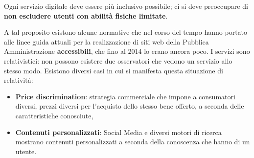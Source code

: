 \bigbreak
Ogni servizio digitale deve essere più inclusivo possibile; ci si deve preoccupare di \textbf{non escludere utenti con abilità fisiche limitate}. 

A tal proposito esistono alcune normative che nel corso del tempo hanno portato alle linee guida attuali per la realizzazione di siti web della Pubblica Amministrazione \textbf{accessibili}, che fino al 2014 lo erano ancora poco.
\bigbreak
I servizi sono relativistici: non possono esistere due osservatori che vedono un servizio allo stesso modo. Esistono diversi casi in cui si manifesta questa situazione di relatività:
\begin{itemize}
    \item \textbf{Price discrimination}: strategia commerciale che impone a consumatori diversi, prezzi diversi per l’acquisto dello stesso bene offerto, a seconda delle caratteristiche conosciute,
    \item \textbf{Contenuti personalizzati}: Social Media e diversi motori di ricerca mostrano contenuti personalizzati a seconda della conoscenza che hanno di un utente.
\end{itemize}